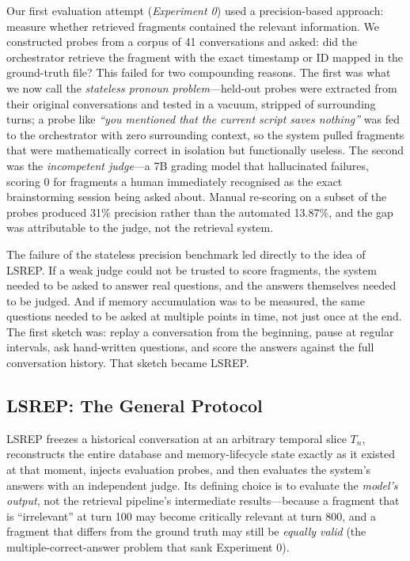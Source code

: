 \documentclass[10pt]{article}
\begin{document}
Our first evaluation attempt (\emph{Experiment 0}) used a precision-based approach: measure whether retrieved fragments contained the relevant information. We constructed probes from a corpus of 41 conversations and asked: did the orchestrator retrieve the fragment with the exact timestamp or ID mapped in the ground-truth file? This failed for two compounding reasons. The first was what we now call the \emph{stateless pronoun problem}---held-out probes were extracted from their original conversations and tested in a vacuum, stripped of surrounding turns; a probe like \emph{``you mentioned that the current script saves nothing''} was fed to the orchestrator with zero surrounding context, so the system pulled fragments that were mathematically correct in isolation but functionally useless. The second was the \emph{incompetent judge}---a 7B grading model that hallucinated failures, scoring 0 for fragments a human immediately recognised as the exact brainstorming session being asked about. Manual re-scoring on a subset of the probes produced 31\% precision rather than the automated 13.87\%, and the gap was attributable to the judge, not the retrieval system.

The failure of the stateless precision benchmark led directly to the idea of LSREP. If a weak judge could not be trusted to score fragments, the system needed to be asked to answer real questions, and the answers themselves needed to be judged. And if memory accumulation was to be measured, the same questions needed to be asked at multiple points in time, not just once at the end. The first sketch was: replay a conversation from the beginning, pause at regular intervals, ask hand-written questions, and score the answers against the full conversation history. That sketch became LSREP.

\subsection{LSREP: The General Protocol}
\label{sec:lsrep}

LSREP freezes a historical conversation at an arbitrary temporal slice $T_n$, reconstructs the entire database and memory-lifecycle state exactly as it existed at that moment, injects evaluation probes, and then evaluates the system's answers with an independent judge. Its defining choice is to evaluate the \emph{model's output}, not the retrieval pipeline's intermediate results---because a fragment that is ``irrelevant'' at turn 100 may become critically relevant at turn 800, and a fragment that differs from the ground truth may still be \emph{equally valid} (the multiple-correct-answer problem that sank Experiment 0).
\end{document}

